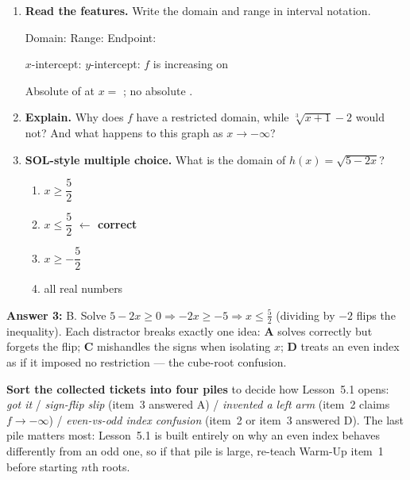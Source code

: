 \documentclass[10pt]{article}
\begin{document}
\begin{enumerate}[leftmargin=1.8em, itemsep=8pt]
  \item \textbf{Read the features.} Write the domain and range in interval notation.

        Domain: \ans{$[-1,\infty)$} \quad Range: \ans{$[-2,\infty)$} \quad Endpoint: 

        \vspace{3pt}
        $x$-intercept:  \quad $y$-intercept:  \quad
        $f$ is increasing on \ans{$[-1,\infty)$}

        \vspace{3pt}
        Absolute  of  at $x=$ ; \; no absolute
        .

  \item \textbf{Explain.} Why does $f$ have a restricted domain, while $\sqrt[3]{x+1}-2$ would not?
        And what happens to this graph as $x\to-\infty$?

  \item \textbf{SOL-style multiple choice.} What is the domain of $h(x) = \sqrt{5-2x}$?
        \begin{enumerate}[label=\Alph*., leftmargin=1.9em, itemsep=1pt]
          \item $x \ge \dfrac{5}{2}$
          \item $x \le \dfrac{5}{2}$ \quad \textcolor{keyred}{\textbf{$\leftarrow$ correct}}
          \item $x \ge -\dfrac{5}{2}$
          \item all real numbers
        \end{enumerate}
\end{enumerate}

\begin{teachernote}
\textbf{Answer 3:} B. Solve $5-2x\ge 0 \Rightarrow -2x\ge -5 \Rightarrow x\le \tfrac52$ (dividing by
$-2$ flips the inequality). Each distractor breaks exactly one idea: \textbf{A} solves correctly but
forgets the flip; \textbf{C} mishandles the signs when isolating $x$; \textbf{D} treats an even index
as if it imposed no restriction --- the cube-root confusion.

\textbf{Sort the collected tickets into four piles} to decide how Lesson~5.1 opens:
\emph{got it} / \emph{sign-flip slip} (item~3 answered A) / \emph{invented a left arm} (item~2 claims
$f\to-\infty$) / \emph{even-vs-odd index confusion} (item~2 or item~3 answered D). The last pile
matters most: Lesson~5.1 is built entirely on why an even index behaves differently from an odd one,
so if that pile is large, re-teach Warm-Up item~1 before starting $n$th roots.
\end{teachernote}
\end{document}
